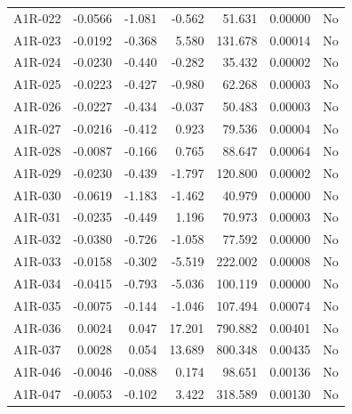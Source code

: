 \begin{longtable}{lrrrrrl}
A1R-022 & -0.0566 & -1.081 & -0.562 & 51.631 & 0.00000 & No \\
A1R-023 & -0.0192 & -0.368 & 5.580 & 131.678 & 0.00014 & No \\
A1R-024 & -0.0230 & -0.440 & -0.282 & 35.432 & 0.00002 & No \\
A1R-025 & -0.0223 & -0.427 & -0.980 & 62.268 & 0.00003 & No \\
A1R-026 & -0.0227 & -0.434 & -0.037 & 50.483 & 0.00003 & No \\
A1R-027 & -0.0216 & -0.412 & 0.923 & 79.536 & 0.00004 & No \\
A1R-028 & -0.0087 & -0.166 & 0.765 & 88.647 & 0.00064 & No \\
A1R-029 & -0.0230 & -0.439 & -1.797 & 120.800 & 0.00002 & No \\
A1R-030 & -0.0619 & -1.183 & -1.462 & 40.979 & 0.00000 & No \\
A1R-031 & -0.0235 & -0.449 & 1.196 & 70.973 & 0.00003 & No \\
A1R-032 & -0.0380 & -0.726 & -1.058 & 77.592 & 0.00000 & No \\
A1R-033 & -0.0158 & -0.302 & -5.519 & 222.002 & 0.00008 & No \\
A1R-034 & -0.0415 & -0.793 & -5.036 & 100.119 & 0.00000 & No \\
A1R-035 & -0.0075 & -0.144 & -1.046 & 107.494 & 0.00074 & No \\
A1R-036 & 0.0024 & 0.047 & 17.201 & 790.882 & 0.00401 & No \\
A1R-037 & 0.0028 & 0.054 & 13.689 & 800.348 & 0.00435 & No \\
A1R-046 & -0.0046 & -0.088 & 0.174 & 98.651 & 0.00136 & No \\
A1R-047 & -0.0053 & -0.102 & 3.422 & 318.589 & 0.00130 & No \\
\bottomrule
\end{longtable}
\endgroup
